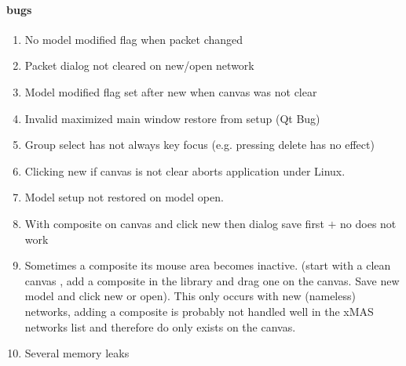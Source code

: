 
\paragraph{bugs}
\begin{enumerate}
\item	No model modified flag when packet changed
\item	Packet dialog not cleared on new/open network
\item	Model modified flag set after new when canvas was not clear
\item	Invalid maximized main window restore from setup (Qt Bug)
\item	Group select has not always key focus (e.g. pressing delete has no effect)
\item	Clicking new if canvas is not clear aborts application under Linux.
\item	Model setup not restored on model open.
\item With composite on canvas and click new then dialog save first $+$ no does not
work
\item Sometimes a composite its mouse area becomes inactive. (start with a clean
canvas , add a composite in the library and drag one on the canvas. Save new
model and click new or open). This only occurs with new (nameless) networks,
adding a composite is probably not handled well in the xMAS networks list and
therefore do only exists on the canvas.
\item	Several memory leaks
\end{enumerate}
